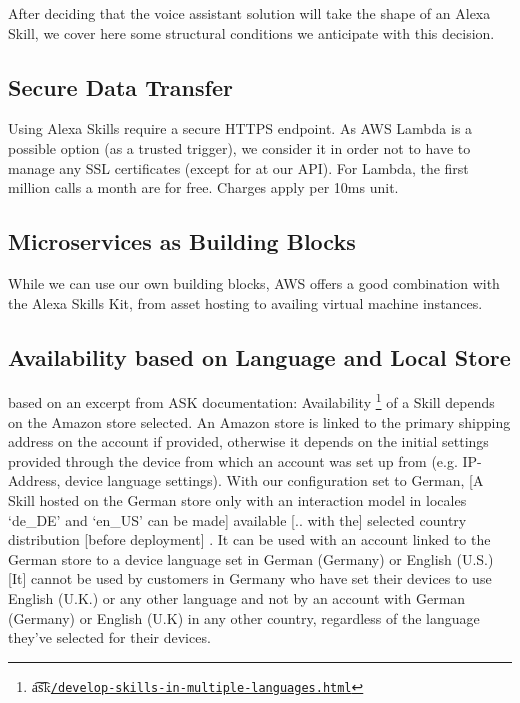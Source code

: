 After deciding that the voice assistant solution will take the shape of an Alexa Skill, we cover here some structural conditions we anticipate with this decision.

	\subsection*{Secure Data Transfer}
	Using Alexa Skills require a secure HTTPS endpoint. As AWS Lambda is a possible option (as a trusted trigger), we consider it in order not to have to manage any SSL certificates (except for at our API). For Lambda, the first million calls a month are for free. Charges apply per 10ms unit.
	
	
	\subsection*{Microservices as Building Blocks} %
	While we can use our own building blocks, AWS offers a good combination with the Alexa Skills Kit, from asset hosting to availing virtual machine instances. 
	

	\subsection*{Availability based on Language and Local Store}
based on an excerpt from ASK documentation: Availability \footnote{\t{a\t{sk}}\href{https://developer.amazon.com/docs/custom-skills/develop-skills-in-multiple-languages.html}{\lstinline|/develop-skills-in-multiple-languages.html|}} of a Skill depends on the Amazon store selected. An Amazon store is linked to the primary shipping address on the account if provided, otherwise it depends on the initial settings provided through the device from which an account was set up from (e.g. IP-Address, device language settings). With our configuration set to German, 
%	
%		
[A Skill hosted on the German store only with an interaction model in locales `de\_DE' and `en\_US' can be made] \space available  [.. with the] selected country distribution [before deployment] \cite{alexaDesignGuide}.
It can be used with an account linked to the German store to a device language set in German (Germany) or English (U.S.) 
		[It] cannot be used by customers in Germany who have set their devices to use English (U.K.) or any other language
		and not by an account with German (Germany) or English (U.K)
		in any other country, regardless of the language they've selected for their devices.
		
